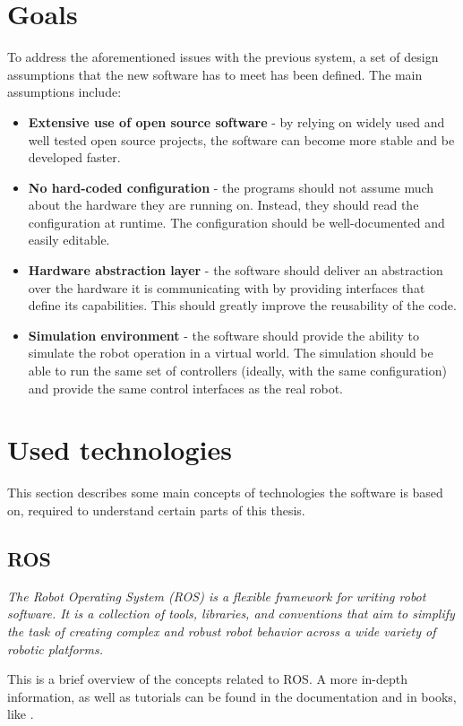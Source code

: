 \documentclass[english,inz,shortabstract]{iithesis}
\begin{document}
\section{Goals}
To address the aforementioned issues with the previous system, a set of design assumptions that the new software has to meet has been defined. The main assumptions include:

\begin{itemize}
    \item \textbf{Extensive use of open source software} - by relying on widely used and well tested open source projects, the software can become more stable and be developed faster.
    \item \textbf{No hard-coded configuration} - the programs should not assume much about the hardware they are running on. Instead, they should read the configuration at runtime. The configuration should be well-documented and easily editable.
    \item \textbf{Hardware abstraction layer} - the software should deliver an abstraction over the hardware it is communicating with by providing interfaces that define its capabilities. This should greatly improve the reusability of the code. 
    \item \textbf{Simulation environment} - the software should provide the ability to simulate the robot operation in a virtual world. The simulation should be able to run the same set of controllers (ideally, with the same configuration) and provide the same control interfaces as the real robot.
\end{itemize}


\section{Used technologies}
This section describes some main concepts of technologies the software is based on, required to understand certain parts of this thesis.

    \subsection{ROS}
    \textit{The Robot Operating System (ROS) is a flexible framework for writing robot software. It is a collection of tools, libraries, and conventions that aim to simplify the task of creating complex and robust robot behavior across a wide variety of robotic platforms.}
    \cite{ros:about}

    This is a brief overview of the concepts related to ROS. A more in-depth information, as well as tutorials can be found in the documentation \cite{ros:documentation} and in books, like \cite{ros:mastering}.
\end{document}
